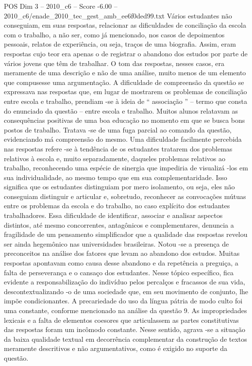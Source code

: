 \begin{textsample}{POS Dim 3 – 2010\_c6 – Score -6.00 – 2010\_c6/enade\_2010\_tec\_gest\_amb\_ee6f0ded99.txt}
Vários estudantes não conseguiam, em suas respostas, relacionar as dificuldades de conciliação da escola com o trabalho, a não ser, como já mencionado, nos casos de depoimentos pessoais, relatos de experiência, ou seja, traços de uma biografia.
Assim, eram respostas cujo teor era apenas o de registrar o abandono dos estudos por parte de vários jovens que têm de trabalhar.
O tom das respostas, nesses casos, era meramente de uma descrição e não de uma análise, muito menos de um elemento que compusesse uma argumentação.
A dificuldade de compreensão da questão se expressava nas respostas que, em lugar de mostrarem os problemas de conciliação entre escola e trabalho, prendiam -se à ideia de “ associação ” – termo que consta do enunciado da questão – entre escola e trabalho.
Muitos alunos relatavam as consequências positivas de uma boa educação no momento em que se busca bons postos de trabalho.
Tratava -se de uma fuga parcial ao comando da questão, evidenciando má compreensão do mesmo.
Uma dificuldade facilmente percebida nas respostas refere -se à tendência de os estudantes tratarem dos problemas relativos à escola e, muito separadamente, daqueles problemas relativos ao trabalho, reconhecendo uma espécie de sinergia que impediria de visualizá -los em sua individualidade, ao mesmo tempo que em sua complementaridade.
Isso significa que os estudantes distinguiam por mero isolamento, ou seja, eles não conseguiam distinguir e articular e, sobretudo, reconhecer as convocações mútuas entre os problemas da escola e do trabalho, no caso explícito dos estudantes trabalhadores.
Essa dificuldade de identificar, associar e analisar aspectos distintos, até mesmo concorrentes, antagônicos e complementares, denuncia a fragilidade de um pensamento simplificador que a qualidade das respostas revelou ser ainda hegemônico nas universidades brasileiras.
Notou -se a presença de preconceitos na análise dos fatores que levam ao abandono dos estudos.
Muitas respostas apontavam como causa desse abandono e da repetência a preguiça, a falta de perseverança e o cansaço dos estudantes.
Nesse tópico específico, fica evidente a responsabilização do indivíduo pelos percalços e fracassos de sua vida, descontextualizando -o de uma sociedade que, em seu movimento de conjunto, lhe impõe condicionantes.
A precariedade do uso da língua pátria de modo culto foi uma constante, conforme mencionado na análise da questão 9.
As impropriedades lexicais e a falta de elementos coesores que articulassem as partes constitutivas das respostas foram um incômodo constante.
Nesse sentido, agrava -se a situação da baixa qualidade textual em decorrência complementar da construção de textos meramente descritivos e não argumentativos, como é exigido no suporte da questão.

\end{textsample}
